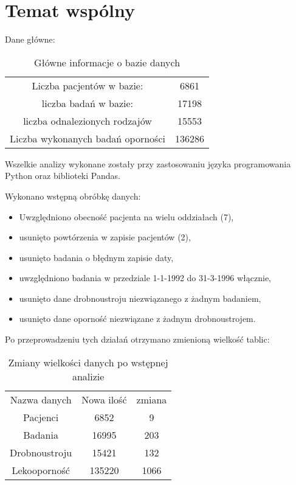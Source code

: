 \documentclass[a4paper,11pt]{article}
\begin{document}
\section{Temat wspólny}

Dane główne:
\begin{table}[H]
\begin{center}
\caption{Główne informacje o bazie danych}
\begin{tabular}{cc}
\hline
Liczba pacjentów w bazie: & 6861 \\
liczba badań w bazie: & 17198 \\
liczba odnalezionych rodzajów & 15553 \\
Liczba wykonanych badań oporności & 136286  \\
\hline
\end{tabular}
\end{center}
\end{table}
Wszelkie analizy wykonane zostały przy zastosowaniu języka programowania Python oraz biblioteki Pandas.

Wykonano wstępną obróbkę danych:
\begin{itemize}
  \item Uwzględniono obecność pacjenta na wielu oddziałach (7),
  \item usunięto powtórzenia w zapisie pacjentów (2), 
  \item usunięto badania o błędnym zapisie daty,
  \item uwzględniono badania w przedziale 1-1-1992 do 31-3-1996 włącznie,
  \item usunięto dane drobnoustroju niezwiązanego z żadnym badaniem,
  \item usunięto dane oporność niezwiązane z żadnym drobnoustrojem.
\end{itemize}

Po przeprowadzeniu tych działań otrzymano zmienioną wielkość tablic:
\begin{table}[H]
\begin{center}
\caption{Zmiany wielkości danych po wstępnej analizie}
\begin{tabular}{c|c|c}
\hline
Nazwa danych & Nowa ilość & zmiana \\
Pacjenci & 6852 & 9 \\
Badania & 16995  & 203\\
Drobnoustroju & 15421 & 132\\
Lekooporność & 135220 & 1066 \\
\hline
\end{tabular}
\end{center}
\end{table}
\end{document}
